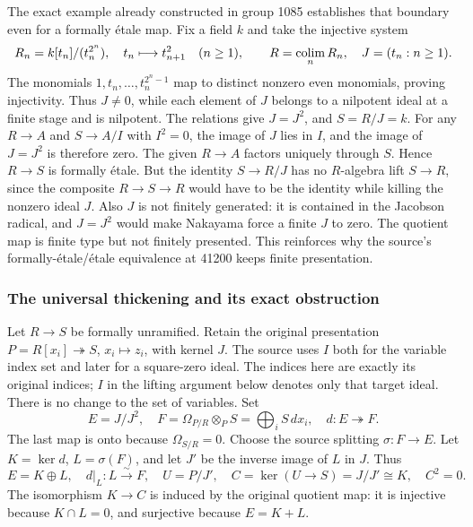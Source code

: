 The exact example already constructed in group 1085 establishes that boundary even for a formally étale map. Fix a field \(k\) and take the injective system \[
R_n=k[t_n]/(t_n^{2^n}),\quad
t_n\longmapsto t_{n+1}^2\quad(n\geq1),\qquad
R=\mathop{\rm colim}_nR_n,\quad J=(t_n:n\geq1).
\] The monomials \(1,t_n,\ldots,t_n^{2^n-1}\) map to distinct nonzero even monomials, proving injectivity. Thus \(J\ne0\), while each element of \(J\) belongs to a nilpotent ideal at a finite stage and is nilpotent. The relations give \(J=J^2\), and \(S=R/J=k\). For any \(R\to A\) and \(S\to A/I\) with \(I^2=0\), the image of \(J\) lies in \(I\), and the image of \(J=J^2\) is therefore zero. The given \(R\to A\) factors uniquely through \(S\). Hence \(R\to S\) is formally étale. But the identity \(S\to R/J\) has no \(R\)-algebra lift \(S\to R\), since the composite \(R\to S\to R\) would have to be the identity while killing the nonzero ideal \(J\). Also \(J\) is not finitely generated: it is contained in the Jacobson radical, and \(J=J^2\) would make Nakayama force a finite \(J\) to zero. The quotient map is finite type but not finitely presented. This reinforces why the source's formally-étale/étale equivalence at 41200 keeps finite presentation.

\subsubsection{The universal thickening and its exact obstruction}\label{algebra-proof-055-the-universal-thickening-and-its-exact-obstruction}

Let \(R\to S\) be formally unramified. Retain the original presentation \(P=R[x_i]\twoheadrightarrow S\), \(x_i\mapsto z_i\), with kernel \(J\). The source uses \(I\) both for the variable index set and later for a square-zero ideal. The indices here are exactly its original indices; \(I\) in the lifting argument below denotes only that target ideal. There is no change to the set of variables. Set \[
E=J/J^2,\quad F=\Omega_{P/R}\otimes_PS=\bigoplus_iS\,dx_i,\quad
d:E\twoheadrightarrow F.
\] The last map is onto because \(\Omega_{S/R}=0\). Choose the source splitting \(\sigma:F\to E\). Let \(K=\ker d\), \(L=\sigma(F)\), and let \(J'\) be the inverse image of \(L\) in \(J\). Thus \[
E=K\oplus L,\quad d|_L:L\xrightarrow{\sim}F,\quad
U=P/J',\quad C=\ker(U\to S)=J/J'\cong K,\quad C^2=0.
\tag{CT-1}
\] The isomorphism \(K\to C\) is induced by the original quotient map: it is injective because \(K\cap L=0\), and surjective because \(E=K+L\).

